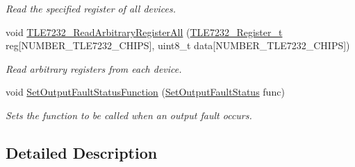 \begin{DoxyCompactItemize}
\begin{DoxyCompactList}\small\item\em Read the specified register of all devices. \end{DoxyCompactList}\item 
void \hyperlink{group__tle7232__driver_ga6e1abd4edfc5d3be4de3f98716b21786}{T\-L\-E7232\-\_\-\-Read\-Arbitrary\-Register\-All} (\hyperlink{group__tle7232__driver_gabd1d28f92015db8d6a418c8346f4b4ff}{T\-L\-E7232\-\_\-\-Register\-\_\-t} reg\mbox{[}N\-U\-M\-B\-E\-R\-\_\-\-T\-L\-E7232\-\_\-\-C\-H\-I\-P\-S\mbox{]}, uint8\-\_\-t data\mbox{[}N\-U\-M\-B\-E\-R\-\_\-\-T\-L\-E7232\-\_\-\-C\-H\-I\-P\-S\mbox{]})
\begin{DoxyCompactList}\small\item\em Read arbitrary registers from each device. \end{DoxyCompactList}\item 
void \hyperlink{group__tle7232__driver_ga1db076dc4fbbff6d149a2a80f3070e6a}{Set\-Output\-Fault\-Status\-Function} (\hyperlink{group__tle7232__driver_gaa9b9a934fcc689bc16f7dbf4ba70feb1}{Set\-Output\-Fault\-Status} func)
\begin{DoxyCompactList}\small\item\em Sets the function to be called when an output fault occurs. \end{DoxyCompactList}\end{DoxyCompactItemize}


\subsection{Detailed Description}


